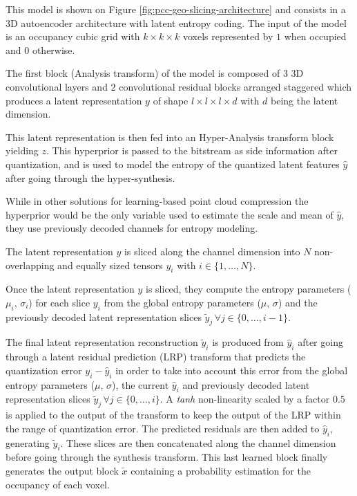This model is shown on Figure \ref{fig:pcc-geo-slicing-architecture} and consists in a 3D autoencoder architecture with latent entropy coding. 
The input of the model is an occupancy cubic grid with $k \times k \times k$ voxels represented by $1$ when occupied and $0$ otherwise. 


The first block (Analysis transform) of the model is composed of $3$ 3D convolutional layers and $2$ convolutional residual blocks arranged staggered which produces a latent representation $y$ of shape $l \times l \times l \times d$ with $d$ being the latent dimension. 


This latent representation is then fed into an Hyper-Analysis transform block yielding $z$. This hyperprior is passed to the bitstream as side information after quantization, and is used to model the entropy of the quantized latent features $\hat{y}$ after going through the hyper-synthesis. 

While in other solutions for learning-based point cloud compression the hyperprior would be the only variable used to estimate the scale and mean of $\hat{y}$, they use previously decoded channels for entropy modeling.

The latent representation $y$ is sliced along the channel dimension into $N$ non-overlapping and equally sized tensors $y_i$ with $i \in \{1, \dots, N\}$. 

Once the latent representation $y$ is sliced, they compute the entropy parameters ($\mu_i,\,\sigma_i$) for each slice $y_i$ from the global entropy parameters ($\mu,\,\sigma$) and the previously decoded latent representation slices $\tilde{y}_j\,\forall j \in \{0,\dots,i-1\}$. 

The final latent representation reconstruction $\tilde{y}_i$ is produced from $\hat{y}_i$ after going through a latent residual prediction (LRP) transform that predicts the quantization error $y_i - \hat{y}_i$ in order to take into account this error from the global entropy parameters ($\mu,\,\sigma$), the current $\hat{y}_i$ and previously decoded latent representation slices $\tilde{y}_j\,\forall j \in \{0,\dots,i\}$. A \textit{tanh} non-linearity scaled by a factor $0.5$ is applied to the output of the transform to keep the output of the LRP within the range of quantization error. 
The predicted residuals are then added to $\hat{y}_i$, generating $\tilde{y}_i$.
These slices are then concatenated along the channel dimension before going through the synthesis transform. This last learned block finally generates the output block $\tilde{x}$ containing a probability estimation for the occupancy of each voxel.
